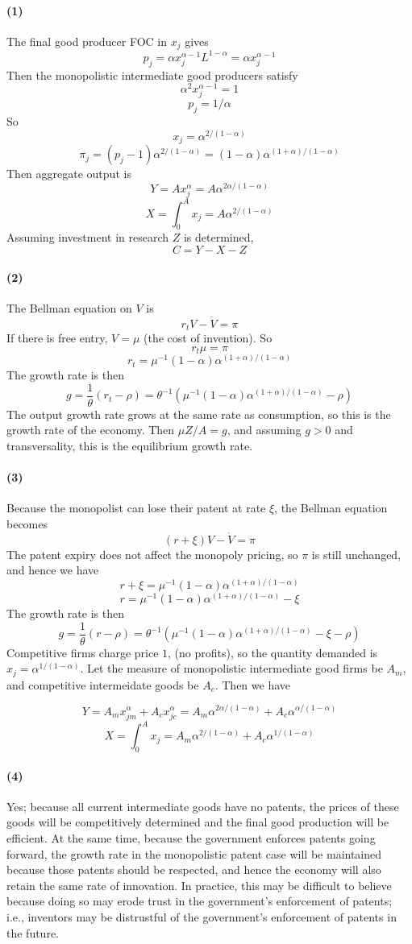 \documentclass[10pt,letter]{article}
\newcommand{\problempart}[1]{\paragraph{#1}}
\begin{document}
\problempart{(1)}
The final good producer FOC in $x_j$ gives
\[ p_j = \alpha x_j^{\alpha - 1}L^{1-\alpha} = \alpha x_j^{\alpha - 1} \]
Then the monopolistic intermediate good producers satisfy
\[ \alpha^2 x_j^{\alpha - 1} = 1 \]
\[ p_j = 1/\alpha \]
So
\[ x_j = \alpha^{2/(1-\alpha)} \]
\[ \pi_j = (p_j - 1) \alpha^{2/(1-\alpha)} = (1-\alpha)\alpha^{(1+\alpha)/(1-\alpha)} \]
Then aggregate output is
\[ Y = A x_j^\alpha = A \alpha^{2\alpha/(1-\alpha)}\]
\[ X = \int_0^A x_j = A\alpha^{2/(1-\alpha)} \]
Assuming investment in research $Z$ is determined,
\[ C = Y - X - Z\]
\problempart{(2)}
The Bellman equation on $V$ is
\[ r_t V - \dot{V} = \pi \]
If there is free entry, $V = \mu$ (the cost of invention). So
\[ r_t \mu = \pi \]
\[ r_t = \mu^{-1}(1-\alpha)\alpha^{(1+\alpha)/(1-\alpha)} \]
The growth rate is then
\[ g = \frac{1}{\theta}(r_t - \rho) = \theta^{-1}(\mu^{-1}(1-\alpha)\alpha^{(1+\alpha)/(1-\alpha)} - \rho) \]
The output growth rate grows at the same rate as consumption, so this is the growth rate of the economy. Then $\mu Z/ A = g$, and assuming $g > 0$ and transversality, this is the equilibrium growth rate.
\problempart{(3)}
Because the monopolist can lose their patent at rate $\xi$, the Bellman equation becomes
\[ (r + \xi)V - \dot{V} = \pi \]
The patent expiry does not affect the monopoly pricing, so $\pi$ is still unchanged, and hence we have
\[ r + \xi = \mu^{-1}(1-\alpha)\alpha^{(1+\alpha)/(1-\alpha)} \]
\[ r = \mu^{-1}(1-\alpha)\alpha^{(1+\alpha)/(1-\alpha)} - \xi \]
The growth rate is then
\[ g = \frac{1}{\theta}(r - \rho) = \theta^{-1}(\mu^{-1}(1-\alpha)\alpha^{(1+\alpha)/(1-\alpha)} - \xi - \rho)\]
Competitive firms charge price $1$, (no profits), so the quantity demanded is $x_j = \alpha^{1/(1-\alpha)}$. Let the measure of monopolistic intermediate good firms be $A_m$, and competitive intermeidate goods be $A_c$. Then we have

\[ Y = A_m x_{jm}^\alpha + A_c x_{jc}^\alpha = A_m \alpha^{2\alpha/(1-\alpha)} + A_c \alpha^{\alpha/(1-\alpha)}\]
\[ X = \int_0^A x_j = A_m \alpha^{2/(1-\alpha)} + A_c \alpha^{1/(1-\alpha)}  \]

\problempart{(4)}
Yes; because all current intermediate goods have no patents, the prices of these goods will be competitively determined and the final good production will be efficient. At the same time, because the government enforces patents going forward, the growth rate in the monopolistic patent case will be maintained because those patents should be respected, and hence the economy will also retain the same rate of innovation. In practice, this may be difficult to believe because doing so may erode trust in the government's enforcement of patents; i.e., inventors may be distrustful of the government's enforcement of patents in the future.
\pagebreak
\end{document}
